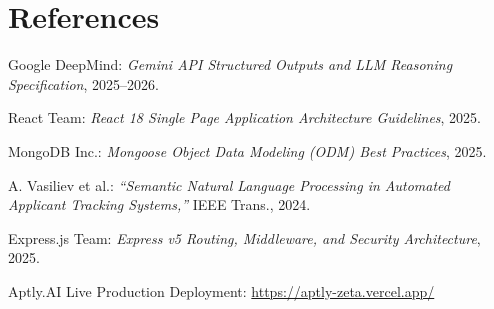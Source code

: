 \documentclass[12pt, a4paper]{article}
\begin{document}
\section{References}
\begin{enumerate}[label={[\arabic*]}, leftmargin=2em, itemsep=2.5pt]
    \item Google DeepMind: \textit{Gemini API Structured Outputs and LLM Reasoning Specification}, 2025--2026.
    \item React Team: \textit{React 18 Single Page Application Architecture Guidelines}, 2025.
    \item MongoDB Inc.: \textit{Mongoose Object Data Modeling (ODM) Best Practices}, 2025.
    \item A. Vasiliev et al.: \textit{``Semantic Natural Language Processing in Automated Applicant Tracking Systems,''} IEEE Trans., 2024.
    \item Express.js Team: \textit{Express v5 Routing, Middleware, and Security Architecture}, 2025.
    \item Aptly.AI Live Production Deployment: \url{https://aptly-zeta.vercel.app/}
\end{enumerate}

\vspace{0.3cm}

\end{document}
